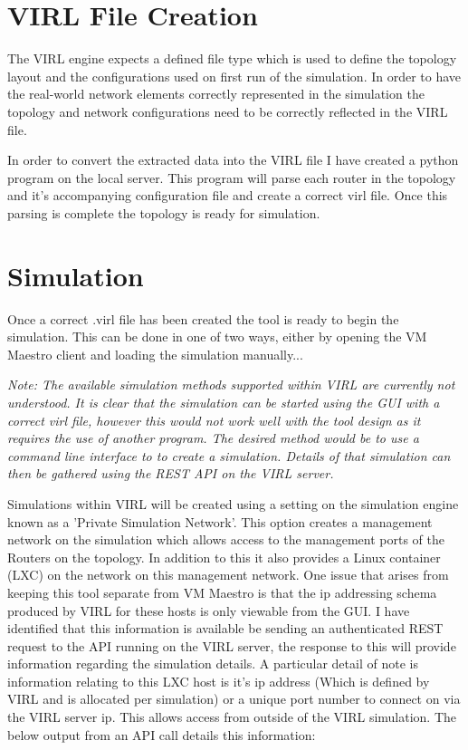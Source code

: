 \documentclass[11pt]{report}
\begin{document}
\section{VIRL File Creation}

The VIRL engine expects a defined file type which is used to define the topology layout and the configurations used on first run of the simulation. In order to have the real-world network elements correctly represented in the simulation the topology and network configurations need to be correctly reflected in the VIRL file. 

In order to convert the extracted data into the VIRL file I have created a python program on the local server. This program will parse each router in the topology and it's accompanying configuration file and create a correct virl file. Once this parsing is complete the topology is ready for simulation.

\section{Simulation}

Once a correct .virl file has been created the tool is ready to begin the simulation. This can be done in one of two ways, either by opening the VM Maestro client and loading the simulation manually...

\textit{Note: The available simulation methods supported within VIRL are currently not understood. It is clear that the simulation can be started using the GUI with a correct virl file, however this would not work well with the tool design as it requires the use of another program. The desired method would be to use a command line interface to to create a simulation. Details of that simulation can then be gathered using the REST API on the VIRL server.}

Simulations within VIRL will be created using a setting on the simulation engine known as a 'Private Simulation Network'. This option creates a management network on the simulation which allows access to the management ports of the Routers on the topology. In addition to this it also provides a Linux container (LXC) on the network on this management network. One issue that arises from keeping this tool separate from VM Maestro is that the ip addressing schema produced by VIRL for these hosts is only viewable from the GUI. I have identified that this information is available be sending an authenticated REST request to the API running on the VIRL server, the response to this will provide information regarding the simulation details. A particular detail of note is information relating to this LXC host is it's ip address (Which is defined by VIRL and is allocated per simulation) or a unique port number to connect on via the VIRL server ip. This allows access from outside of the VIRL simulation. The below output from an API call details this information:
\end{document}
